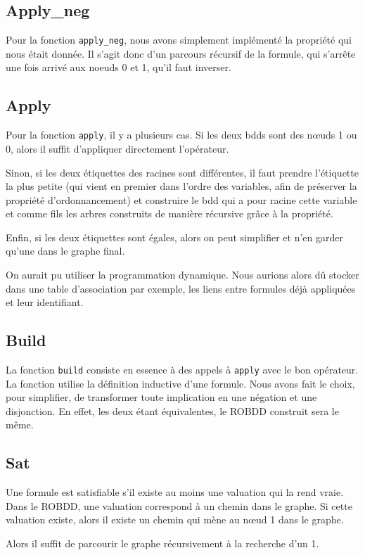 \documentclass[12pt]{article}
\def\code#1{\texttt{#1}}
\begin{document}
\subsection*{Apply\_neg}
Pour la fonction \code{apply\_neg}, nous avons simplement implémenté la propriété qui nous était donnée. Il s'agit donc d'un parcours récursif de la formule, qui s'arrête une fois arrivé aux noeuds 0 et 1, qu'il faut inverser.

\subsection*{Apply}
Pour la fonction \code{apply}, il y a plusieurs cas.
Si les deux bdds sont des n\oe uds 1 ou 0, alors il suffit d'appliquer directement l'opérateur.

Sinon, si les deux étiquettes des racines sont différentes, il faut prendre l'étiquette la plus petite (qui vient en premier dans l'ordre des variables, afin de préserver la propriété d'ordonnancement) et construire le bdd qui a pour racine cette variable et comme fils les arbres construits de manière récursive grâce à la propriété.

Enfin, si les deux étiquettes sont égales, alors on peut simplifier et n'en garder qu'une dans le graphe final.

On aurait pu utiliser la programmation dynamique. Nous aurions alors dû stocker dans une table d'association par exemple, les liens entre formules déjà appliquées et leur identifiant.

\subsection*{Build}
La fonction \code{build} consiste en essence à des appels à \code{apply} avec le bon opérateur. La fonction utilise la définition inductive d'une formule.
Nous avons fait le choix, pour simplifier, de transformer toute implication en une négation et une disjonction. En effet, les deux étant équivalentes, le ROBDD construit sera le même.

\subsection*{Sat}
Une formule est satisfiable s'il existe au moins une valuation qui la rend vraie. Dans le ROBDD, une valuation correspond à un chemin dans le graphe. Si cette valuation existe, alors il existe un chemin qui mène au n\oe ud 1 dans le graphe.

Alors il suffit de parcourir le graphe récursivement à la recherche d'un 1.
\end{document}
